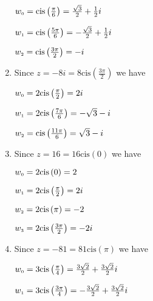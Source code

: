 \documentclass{ximera}
\begin{document}
\begin{enumerate}
\begin{multicols}{3}
$w_{\text{\tiny$0$}} = \text{cis}\left(\frac{\pi}{6}\right) = \frac{\sqrt{3}}{2} + \frac{1}{2}i$

$w_{\text{\tiny$1$}} = \text{cis}\left(\frac{5\pi}{6}\right) = -\frac{\sqrt{3}}{2} + \frac{1}{2}i$

$w_{\text{\tiny$2$}} = \text{cis}\left(\frac{3\pi}{2}\right) = -i$

\end{multicols}

\item Since $z = -8i = 8\text{cis}\left(\frac{3\pi}{2}\right)$ we have 

\begin{multicols}{3}

$w_{\text{\tiny$0$}} = 2\text{cis}\left(\frac{\pi}{2}\right) = 2i$

$w_{\text{\tiny$1$}} = 2\text{cis}\left(\frac{7\pi}{6}\right) = -\sqrt{3} -i$

$w_{\text{\tiny$2$}} = \text{cis}\left(\frac{11\pi}{6}\right) = \sqrt{3}-i$

\end{multicols}


\item Since $z=16 = 16\text{cis}\left(0 \right)$ we have 

\begin{multicols}{2}

$w_{\text{\tiny$0$}} =2\text{cis}\left(0\right) =2$

$w_{\text{\tiny$1$}} = 2\text{cis}\left(\frac{\pi}{2}\right) = 2i$

\end{multicols}

\begin{multicols}{2}

$w_{\text{\tiny$2$}} = 2\text{cis}\left(\pi\right) = -2$

$w_{\text{\tiny$3$}} = 2\text{cis}\left(\frac{3\pi}{2}\right) = -2i$

\end{multicols}


\item Since $z=-81 = 81\text{cis}\left(\pi \right)$ we have 

\begin{multicols}{2}

$w_{\text{\tiny$0$}} =3\text{cis}\left(\frac{\pi}{4}\right) = \frac{3\sqrt{2}}{2} + \frac{3\sqrt{2}}{2}i$

$w_{\text{\tiny$1$}} = 3\text{cis}\left(\frac{3\pi}{4}\right) =-\frac{3\sqrt{2}}{2} + \frac{3\sqrt{2}}{2}i$



\end{multicols}
\end{enumerate}
\end{document}
